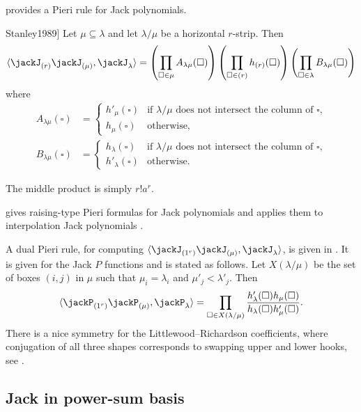 provides a Pieri rule for Jack polynomials.
\begin{theorem}[See \cite[Thm.~6.1]{Stanley1989}]
Let $\mu \subseteq \lambda$ and let $\lambda/\mu$ be a horizontal $r$-strip.
Then
\begin{equation*}
\langle \jackJ_{(r)}\jackJ_{(\mu)},  \jackJ_\lambda \rangle
=
\left( \prod_{\square \in \mu} A_{\lambda \mu}(\square) \right)
\left( \prod_{\square \in (r)} h_{(r)}(\square) \right)
\left( \prod_{\square \in \lambda} B_{\lambda \mu}(\square) \right)
\end{equation*}
where
\begin{align}
A_{\lambda \mu}(\square)
&=
\begin{cases}
h'_\mu(\square) &\text{if $\lambda/\mu$ does not intersect the column of
  $\square$,} \\
h_\mu(\square) &\text{otherwise,}
\end{cases} \\
B_{\lambda \mu}(\square)
&=
\begin{cases}
h_\lambda(\square) &\text{if $\lambda/\mu$ does not intersect the column of
  $\square$,} \\
h'_\lambda(\square) &\text{otherwise.}
\end{cases}
\end{align}
\end{theorem}
The middle product is simply $r!a^r$.

 gives raising-type Pieri formulas for Jack
polynomials and applies them to interpolation Jack polynomials
\cite{Shibukawa2020}.

A dual Pieri rule, for computing
$\langle \jackJ_{(1^r)}\jackJ_{(\mu)},  \jackJ_\lambda \rangle$, is given
in \cite[Thm.~6.1]{KnopSahi1996}.  It is given for the Jack $P$ functions
and is stated as follows.
Let $X(\lambda/\mu)$ be the set of boxes $(i,j)$ in $\mu$ such that
$\mu_i=\lambda_i$
and $\mu'_j \lt \lambda'_j$. Then
\[
\langle \jackP_{(1^r)}\jackP_{(\mu)},  \jackP_\lambda \rangle
=
\prod_{\square \in X(\lambda/\mu)}
\frac{ h'_\lambda(\square) h_\mu(\square)}{h_\lambda(\square) h'_\mu(\square)}.
\]
There is a nice symmetry for the Littlewood--Richardson coefficients,
where conjugation of all three shapes corresponds to swapping upper and lower hooks,
see \cite[Sec.~2.3]{Naqvi2016}.



\subsection[jackChromaticPowerSumExpansion]{Jack in power-sum basis}

